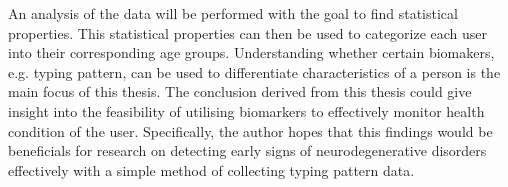 An analysis of the data will be performed with the goal to find statistical properties.
This statistical properties can then be used to categorize each user into their corresponding age groups.
Understanding whether certain biomakers, e.g. typing pattern, can be used to differentiate characteristics of a person is the main focus of this thesis.
The conclusion derived from this thesis could give insight into the feasibility of utilising biomarkers to effectively monitor health condition of the user.
Specifically, the author hopes that this findings would be beneficials for research on detecting early signs of neurodegenerative disorders effectively with a simple method of collecting typing pattern data.

